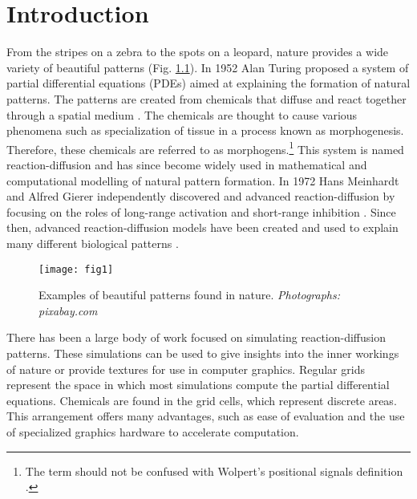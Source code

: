 \chapter{Introduction}
From the stripes on a zebra to the spots on a leopard, nature provides a wide variety of beautiful patterns (Fig. \ref{fig:naturalPatterns1}). In 1952 Alan Turing proposed a system of partial differential equations (PDEs) aimed at explaining the formation of natural patterns. The patterns are created from chemicals that diffuse and react together through a spatial medium \citep{turing1952}. The chemicals are thought to cause various phenomena such as specialization of tissue in a process known as morphogenesis. Therefore, these chemicals are referred to as morphogens.\footnote{The term  should not be confused with Wolpert's positional signals definition \citep{wolpert1996}.} This system is named reaction-diffusion and has since become widely used in mathematical and computational modelling of natural pattern formation. In 1972 Hans Meinhardt and Alfred Gierer independently discovered and advanced reaction-diffusion by focusing on the roles of long-range activation and short-range inhibition \citep{gierer1972}. Since then, advanced reaction-diffusion models have been created and used to explain many different biological patterns \citep{garzon2011, fowler1992, lefevre2010, meinhardt2009}.

\begin{figure}[H]
  \centering
  \texttt{[image: fig1]}
  \caption[Examples of beautiful patterns found in nature]{Examples of beautiful patterns found in nature. \textit{Photographs: pixabay.com}}
  \label{fig:naturalPatterns1}
\end{figure}


There has been a large body of work focused on simulating reaction-diffusion patterns. These simulations can be used to give insights into the inner workings of nature or provide textures for use in computer graphics. Regular grids represent the space in which most simulations compute the partial differential equations. Chemicals are found in the grid cells, which represent discrete areas. This arrangement offers many advantages, such as ease of evaluation and the use of specialized graphics hardware to accelerate computation.

